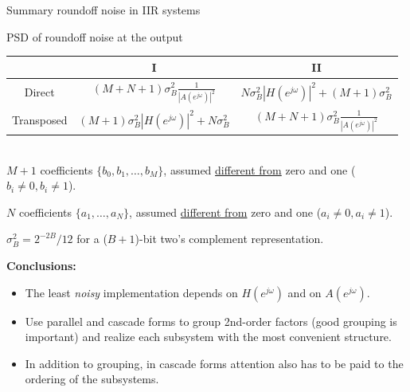 \documentclass[10pt, handout]{beamer}
\begin{document}
\begin{frame}{Summary roundoff noise in IIR systems}

PSD of roundoff noise at the output
~\\

\begin{tabular}{c||c|c}
	  & I & II \\
	\hline
	Direct & $\displaystyle(M+N+1)\sigma_B^2\frac{1}{|A(e^{j\omega})|^2}$ & $\displaystyle N\sigma_{B}^2|H(e^{j\omega})|^2 + (M+1)\sigma_{B}^2$ \\
	Transposed & $\displaystyle(M+1)\sigma_B^2|H(e^{j\omega})|^2 + N\sigma_B^2$ & $\displaystyle (M+N+1)\sigma_B^2\frac{1}{|A(e^{j\omega})|^2}$ \\
	\hline
\end{tabular}
~\\

$M+1$ coefficients $\{b_0, b_1, \ldots, b_M\}$, assumed \underline{different from} zero and one ($b_i \neq 0, b_i \neq 1$).

$N$ coefficients $\{a_1, \ldots, a_N\}$,  assumed \underline{different from} zero and one ($a_i \neq 0, a_i \neq 1$).

$\sigma_B^2 = 2^{-2B}/12$ for a ($B+1$)-bit two's complement representation.

\vspace{0.5cm}
\textbf{Conclusions:}
\begin{itemize}
	\item The least \textit{noisy} implementation depends on $H(e^{j\omega})$ and on $A(e^{j\omega})$.
	\item Use parallel and cascade forms to group 2nd-order factors (good grouping is important) and realize each subsystem with the most convenient structure.
	\item In addition to grouping, in cascade forms attention also has to be paid to the ordering of the subsystems.
\end{itemize}
\end{frame}
\end{document}
